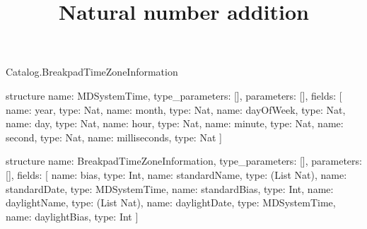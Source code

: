 \begin{lexlean}{Catalog.BreakpadTimeZoneInformation}
\title{Natural number addition}
\begin{semanticmodule}
structure{
  name: MDSystemTime,
  type_parameters: [],
  parameters: [],
  fields: [
    {name: year, type: Nat},
    {name: month, type: Nat},
    {name: dayOfWeek, type: Nat},
    {name: day, type: Nat},
    {name: hour, type: Nat},
    {name: minute, type: Nat},
    {name: second, type: Nat},
    {name: milliseconds, type: Nat}
  ]
}

structure{
  name: BreakpadTimeZoneInformation,
  type_parameters: [],
  parameters: [],
  fields: [
    {name: bias, type: Int},
    {name: standardName, type: (List Nat)},
    {name: standardDate, type: MDSystemTime},
    {name: standardBias, type: Int},
    {name: daylightName, type: (List Nat)},
    {name: daylightDate, type: MDSystemTime},
    {name: daylightBias, type: Int}
  ]
}
\end{semanticmodule}
\end{lexlean}
